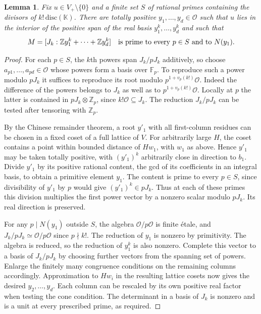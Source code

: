 \documentclass[11pt,letterpaper]{article}
\newtheorem{lemma}[lemma]{Lemma}
\theoremstyle{definition}
\numberwithin{equation}{section}
\begin{document}
\begin{lemma}\label{lem:hpowlattice}
Fix $u\in V_+\setminus\{0\}$ and a finite set $S$ of rational primes
containing the divisors of $k!\,\mathrm{disc}(\mathbb K)$. There are
totally positive $y_1,\dots,y_d\in\mathcal O$ such that $u$ lies in
the interior of the positive span of the real basis
$y_1^k,\dots,y_d^k$ and such that
\[
 M=[J_k:\mathbb Z y_1^k+\cdots+\mathbb Z y_d^k]
       \quad\hbox{is prime to every $p\in S$ and to $N(y_1)$.}
\]
\end{lemma}
\begin{proof}
For each $p\in S$, the $k$th powers span $J_k/pJ_k$ additively,
so choose $a_{p1},\dots,a_{pd}\in\mathcal O$ whose powers form a basis
over $\mathbb F_p$. To reproduce such a power modulo $pJ_k$ it
suffices to reproduce its root modulo $p^{1+v_p(k!)}\mathcal O$.
Indeed the difference of the powers belongs to $J_k$ as well as to
$p^{1+v_p(k!)}\mathcal O$. Locally at $p$ the latter is contained in
$pJ_k\otimes\mathbb Z_p$, since $k!\mathcal O\subseteq J_k$.
The reduction $J_k/pJ_k$ can be tested after tensoring with $\mathbb Z_p$.

By the Chinese remainder theorem, a root $y'_1$ with all first-column
residues can be chosen in a fixed coset of a full lattice of $V$.
For arbitrarily large $H$, the coset contains a point within bounded
distance of $H w_1$, with $w_1$ as above. Hence $y'_1$ may be taken
totally positive, with $(y'_1)^k$ arbitrarily close in direction
to $b_1$. Divide $y'_1$ by its positive rational content, the gcd of
its coefficients in an integral basis, to obtain a primitive element
$y_1$. The content is prime to every $p\in S$, since divisibility of
$y'_1$ by $p$ would give $(y'_1)^k\in pJ_k$. Thus at each of these
primes this division multiplies the first power vector by a nonzero
scalar modulo $pJ_k$. Its real direction is preserved.

For any $p\mid N(y_1)$ outside $S$, the algebra
$\mathcal O/p\mathcal O$ is finite \'etale, and
$J_k/pJ_k\simeq\mathcal O/p\mathcal O$ since $p\nmid k!$.
The reduction of $y_1$ is nonzero by primitivity. The algebra is
reduced, so the reduction of $y_1^k$ is also nonzero. Complete this
vector to a basis of $J_k/pJ_k$ by choosing further vectors from the
spanning set of powers. Enlarge the finitely many congruence conditions
on the remaining columns accordingly. Approximation to $Hw_i$ in
the resulting lattice cosets now gives the desired $y_2,\dots,y_d$.
Each column can be rescaled by its own positive real factor when
testing the cone condition. The determinant in a basis of $J_k$
is nonzero and is a unit at every prescribed prime, as required.
\end{proof}
\end{document}
